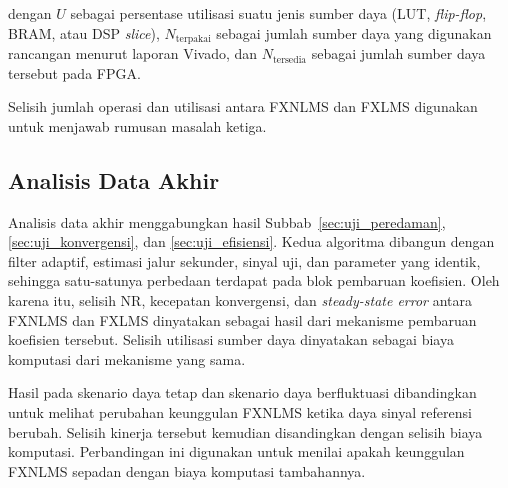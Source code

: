dengan $U$ sebagai persentase utilisasi suatu jenis sumber daya (LUT, \emph{flip-flop}, BRAM, atau DSP \emph{slice}), $N_{\text{terpakai}}$ sebagai jumlah sumber daya yang digunakan rancangan menurut laporan Vivado, dan $N_{\text{tersedia}}$ sebagai jumlah sumber daya tersebut pada FPGA.

Selisih jumlah operasi dan utilisasi antara FXNLMS dan FXLMS digunakan untuk menjawab rumusan masalah ketiga.

\subsection{Analisis Data Akhir}
\label{sec:analisis_akhir}

Analisis data akhir menggabungkan hasil Subbab~\ref{sec:uji_peredaman}, \ref{sec:uji_konvergensi}, dan \ref{sec:uji_efisiensi}. Kedua algoritma dibangun dengan filter adaptif, estimasi jalur sekunder, sinyal uji, dan parameter yang identik, sehingga satu-satunya perbedaan terdapat pada blok pembaruan koefisien. Oleh karena itu, selisih NR, kecepatan konvergensi, dan \emph{steady-state error} antara FXNLMS dan FXLMS dinyatakan sebagai hasil dari mekanisme pembaruan koefisien tersebut. Selisih utilisasi sumber daya dinyatakan sebagai biaya komputasi dari mekanisme yang sama.

Hasil pada skenario daya tetap dan skenario daya berfluktuasi dibandingkan untuk melihat perubahan keunggulan FXNLMS ketika daya sinyal referensi berubah. Selisih kinerja tersebut kemudian disandingkan dengan selisih biaya komputasi. Perbandingan ini digunakan untuk menilai apakah keunggulan FXNLMS sepadan dengan biaya komputasi tambahannya.